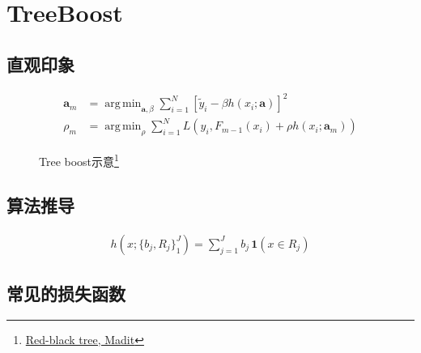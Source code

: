 
\section{TreeBoost}
\subsection{直观印象}
\begin{frame}
    \begin{align*}
        \mathbf{a}_m &= \operatorname{arg \, min}_{\mathbf{a}, \beta} \textstyle \sum_{i=1}^N \left [ \tilde{y}_i - \beta h(x_i; \mathbf{a}) \right ]^2 \\
        \rho_m &= \operatorname{arg \, min}_\rho \textstyle \sum_{i=1}^N L \left ( y_i, F_{m-1}(x_i) + \rho h(x_i; \mathbf{a}_m) \right)
    \end{align*}

    \begin{figure}
        \centering
        \resizebox{\onepicwidth}{!}{}
        \caption{Tree boost示意\footnote{
                 \href{http://www.texample.net/tikz/examples/red-black-tree/}{Red-black tree, Madit}}}
    \end{figure}
\end{frame}


\subsection{算法推导}
\begin{frame}
    \begin{align*}
        h(x; \{b_j, R_j\}_1^J) = \sum_{j=1}^J b_j \, \mathbf{1}(x \in R_j)
    \end{align*}
\end{frame}




\subsection{常见的损失函数}


